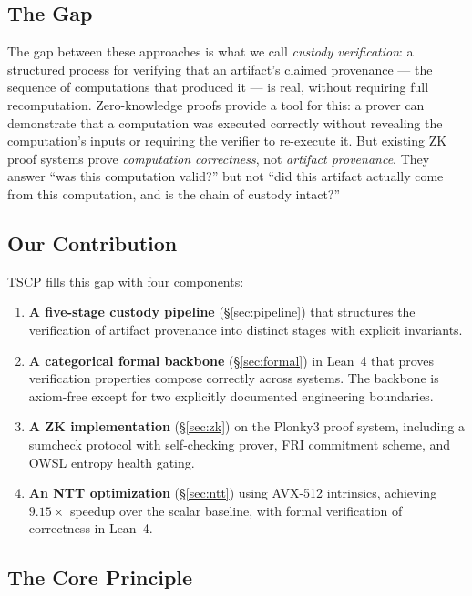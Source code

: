 \documentclass[11pt,a4paper]{article}
\begin{document}
\subsection{The Gap}

The gap between these approaches is what we call \emph{custody verification}: a structured process for verifying that an artifact's claimed provenance --- the sequence of computations that produced it --- is real, without requiring full recomputation. Zero-knowledge proofs provide a tool for this: a prover can demonstrate that a computation was executed correctly without revealing the computation's inputs or requiring the verifier to re-execute it. But existing ZK proof systems prove \emph{computation correctness}, not \emph{artifact provenance}. They answer ``was this computation valid?'' but not ``did this artifact actually come from this computation, and is the chain of custody intact?''

\subsection{Our Contribution}

TSCP fills this gap with four components:

\begin{enumerate}
\item \textbf{A five-stage custody pipeline} (\S\ref{sec:pipeline}) that structures the verification of artifact provenance into distinct stages with explicit invariants.
\item \textbf{A categorical formal backbone} (\S\ref{sec:formal}) in Lean~4 that proves verification properties compose correctly across systems. The backbone is axiom-free except for two explicitly documented engineering boundaries.
\item \textbf{A ZK implementation} (\S\ref{sec:zk}) on the Plonky3 proof system, including a sumcheck protocol with self-checking prover, FRI commitment scheme, and OWSL entropy health gating.
\item \textbf{An NTT optimization} (\S\ref{sec:ntt}) using AVX-512 intrinsics, achieving $9.15\times$ speedup over the scalar baseline, with formal verification of correctness in Lean~4.
\end{enumerate}

\subsection{The Core Principle}
\end{document}

